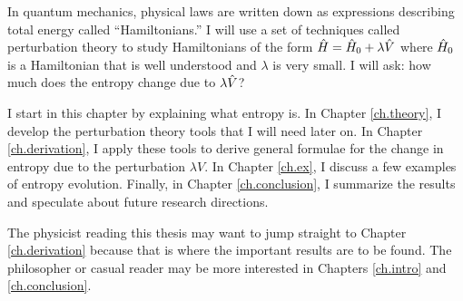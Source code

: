 
In quantum mechanics, physical laws are written down as expressions describing total energy called ``Hamiltonians.'' I will use a set of techniques called perturbation theory to study Hamiltonians of the form \(\hat{H} = \hat{H}_0 + \lambda \hat{V}\) where \(\hat{H}_0\) is a Hamiltonian that is well understood and \(\lambda\) is very small. I will ask: how much does the entropy change due to \(\lambda \hat{V}\)?

I start in this chapter by explaining what entropy is. In Chapter \ref{ch.theory}, I develop the perturbation theory tools that I will need later on. In Chapter \ref{ch.derivation}, I apply these tools to derive general formulae for the change in entropy due to the perturbation \(\lambda V\). In Chapter \ref{ch.ex}, I discuss a few examples of entropy evolution. Finally, in Chapter \ref{ch.conclusion}, I summarize the results and speculate about future research directions.

The physicist reading this thesis may want to jump straight to Chapter \ref{ch.derivation} because that is where the important results are to be found. The philosopher or casual reader may be more interested in Chapters \ref{ch.intro} and \ref{ch.conclusion}.
